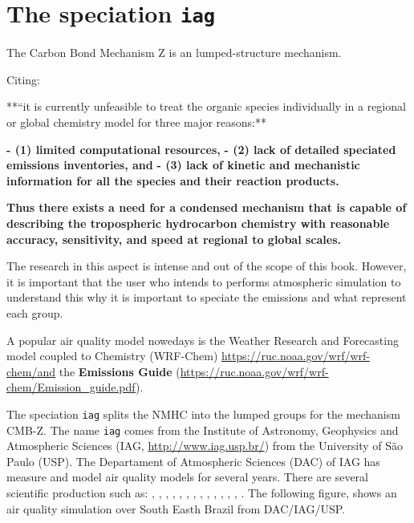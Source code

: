 \documentclass[12pt,graybox,envcountchap,sectrefs]{krantz}
\theoremstyle{definition}
\theoremstyle{definition}
\theoremstyle{definition}
\theoremstyle{remark}
\begin{document}
\section{\texorpdfstring{The speciation
\texttt{iag}}{The speciation iag}}\label{the-speciation-iag}

The Carbon Bond Mechanism Z \citeyearpar{cbmz} is an lumped-structure
mechanism.

Citing:

**``it is currently unfeasible to treat the organic species individually
in a regional or global chemistry model for three major reasons:**

\textbf{- (1) limited computational resources,} \textbf{- (2) lack of
detailed speciated emissions inventories, and } \textbf{- (3) lack of
kinetic and mechanistic information for all the species and their
reaction products.}

\textbf{Thus there exists a need for a condensed mechanism that is
capable of describing the tropospheric hydrocarbon chemistry with
reasonable accuracy, sensitivity, and speed at regional to global
scales. }

The research in this aspect is intense and out of the scope of this
book. However, it is important that the user who intends to performs
atmospheric simulation to understand this why it is important to
speciate the emissions and what represent each group.

A popular air quality model nowedays is the Weather Research and
Forecasting model coupled to Chemistry (WRF-Chem) \citep{Grelletal2005}
\url{https://ruc.noaa.gov/wrf/wrf-chem/and} the \textbf{Emissions Guide}
(\url{https://ruc.noaa.gov/wrf/wrf-chem/Emission_guide.pdf}).

The speciation \texttt{iag} splits the NMHC into the lumped groups for
the mechanism CMB-Z. The name \texttt{iag} comes from the Institute of
Astronomy, Geophysics and Atmospheric Sciences (IAG,
\url{http://www.iag.usp.br/}) from the University of São Paulo (USP).
The Departament of Atmospheric Sciences (DAC) of IAG has measure and
model air quality models for several years. There are several scientific
production such as: \citet{Nogueiraetal2015},
\citet{HOSHYARIPOUR2016365}, \citet{Andradeetal2017},
\citet{Freitasetal2005}, \citet{martins2006emission},
\citet{perez2014emission}, \citet{ulke2001modeling},
\citet{vivanco2006validation}, \citet{boian2012characterization},
\citet{Andrade2012}, \citet{Andradeetal2015}, \citet{VaraVelaetal2015},
\citet{Rafee2015}, \citet{Ibarraetal2017b}. The following figure, shows
an air quality simulation over South Easth Brazil from DAC/IAG/USP.
\end{document}
